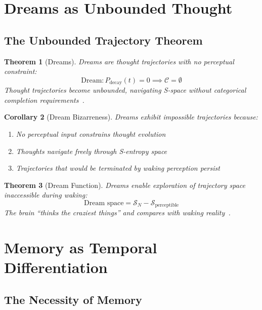 \documentclass[aps,prd,twocolumn,superscriptaddress,floatfix,nofootinbib]{revtex4-2}
\newtheorem{theorem}{Theorem}[section]
\newtheorem{corollary}[theorem]{Corollary}
\theoremstyle{remark}
\newcommand{\Sspace}{\mathcal{S}}
\newcommand{\Ccat}{\mathcal{C}}
\newcommand{\Pdecay}{P_{\mathrm{decay}}}
\begin{document}
\section{Dreams as Unbounded Thought}
\label{sec:dreams}

\subsection{The Unbounded Trajectory Theorem}

\begin{theorem}[Dreams]
\label{thm:dreams}
Dreams are thought trajectories with no perceptual constraint:
\begin{equation}
\text{Dream}: \Pdecay(t) = 0 \implies \Ccat = \emptyset
\end{equation}
Thought trajectories become unbounded, navigating S-space without categorical completion requirements~\cite{hobson2000dreaming,siclari2017neural,turing1952chemical}.
\end{theorem}

\begin{corollary}[Dream Bizarreness]
\label{cor:bizarreness}
Dreams exhibit impossible trajectories because:
\begin{enumerate}
\item No perceptual input constrains thought evolution
\item Thoughts navigate freely through S-entropy space
\item Trajectories that would be terminated by waking perception persist
\end{enumerate}
\end{corollary}

\begin{theorem}[Dream Function]
\label{thm:dream_function}
Dreams enable exploration of trajectory space inaccessible during waking:
\begin{equation}
\text{Dream space} = \Sspace_N - \Sspace_{\text{perceptible}}
\end{equation}
The brain ``thinks the craziest things'' and compares with waking reality~\cite{walker2009overnight}.
\end{theorem}

\section{Memory as Temporal Differentiation}
\label{sec:memory}

\subsection{The Necessity of Memory}
\end{document}
